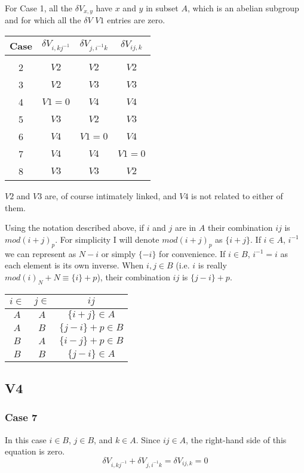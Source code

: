 \documentclass{revtex4-1}
\begin{document}
\par
For Case 1, all the $\delta V_{x,y}$ have $x$ and $y$ in subset $A$, which is
an abelian subgroup and for which all the $\delta V$ $V1$ entries are
zero.  

\begin{center}
\begin{tabular}{c|ccc}
Case & $\delta V_{i,kj^{-1}}$ & $\delta V_{j,i^{-1}k}$ & $\delta V_{ij,k}$ \\ \hline \\
2 & $V2$ & $V2$ & $V2$ \\
3 & $V2$ & $V3$ & $V3$ \\
4 & $V1=0$ & $V4$ & $V4$ \\
5 & $V3$ & $V2$ & $V3$ \\ 
6 & $V4$ & $V1=0$ & $V4$ \\ 
7 & $V4$ & $V4$ & $V1=0$ \\ 
8 & $V3$ & $V3$ & $V2$ 
\end{tabular}
\end{center}

\par $V2$ and $V3$ are, of course intimately linked, and $V4$ is not related to 
either of them.

\par Using the notation described above, if $i$ and $j$ are in $A$ their combination
$ij$ is $mod(i+j)_p$.  For simplicity I will denote $mod(i+j)_p$ as $\{i+j\}$.  If 
$i \in A$, $i^{-1}$
we can represent as $N-i$ or simply $\{-i\}$ for convenience.  If $i \in B$, $i^{-1} = i$ as
each element is its own inverse.
When $i,j \in B$ (i.e. $i$ is really $mod(i)_N +N \equiv \{i\}+p$),
their combination $ij$ is $\{j-i\}+p$.

\begin{center}
\begin{tabular}{c|c|c}
$i \in$  & $j \in$ & $ij$ \\ \hline
$A$ & $A$ & $\{i+j\} \in A$ \\
$A$ & $B$ & $\{j-i\} +p \in B$ \\
$B$ & $A$ & $\{i-j\} +p \in B$ \\
$B$ & $B$ & $\{j-i\} \in A$
\end{tabular}
\end{center}


\subsection{V4}
\subsubsection{Case 7}
In this case $i \in B$, $j \in B$, and $k \in A$.  Since $ij \in A$, the right-hand
side of this equation is zero.
$$\delta V_{i,kj^{-1}} + \delta V_{j,i^{-1}k} = \delta V_{ij,k} =0$$
\end{document}
